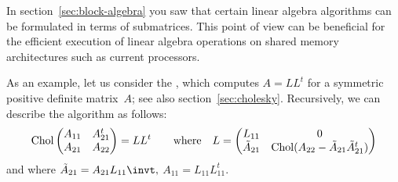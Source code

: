 
In section~\ref{sec:block-algebra} you saw that certain linear algebra
algorithms can be formulated in terms of submatrices. This point of
view can be beneficial for the efficient execution of linear algebra
operations on shared memory architectures such as current
 processors.

\newcommand\chol{\mathop{\mathrm{Chol}}}
As an example, let us consider the ,
which computes $A=LL^t$ for a symmetric positive definite matrix~$A$;
see also section~\ref{sec:cholesky}.
Recursively, we can describe the algorithm as follows:
\[ \chol
\begin{pmatrix}
  A_{11}&A_{21}^t\\ A_{21}&A_{22}
\end{pmatrix} = LL^t\qquad\hbox{where}\quad L=
\begin{pmatrix}
  L_{11}&0\\ \tilde A_{21} &\chol(A_{22}-\tilde A_{21}\tilde A_{21}^t)
\end{pmatrix}
\]
and where $\tilde A_{21}=A_{21}L_{11}\invt,$ $A_{11}=L_{11}L_{11}^t$.

